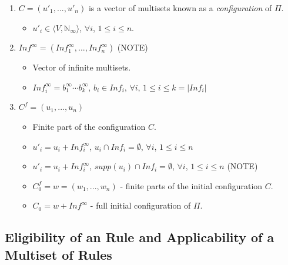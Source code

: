 \documentclass{article}
\begin{document}
\begin{appendices}
\begin{enumerate}
   \item $C = (u'_1,...,u'_n)$ is a vector of multisets known as a \emph{configuration} of $\Pi$.
         \begin{itemize}
         \item $u'_i \in \langle V, \mathbb{N}_{\infty} \rangle$, $\forall i$, $1 \leq i \leq n$.
         \end{itemize}
   \item $Inf^{\infty} = (Inf_1^{\infty},...,Inf_n^{\infty})$ (NOTE)
         \begin{itemize}
         \item Vector of infinite multisets.
         \item $Inf^{\infty}_i = b_1^{\infty}\cdots b_k^{\infty}$, $b_i \in Inf_i$, $\forall i$, $1 \leq i \leq k = |Inf_i|$ 
         \end{itemize}
   \item $C^{f} = (u_1,...,u_n)$
         \begin{itemize}
         \item Finite part of the configuration $C$.
         \item $u'_i = u_i + Inf_i^{\infty}$, $u_i \cap Inf_i = \emptyset$, $\forall i$, $1 \leq i \leq n$ 
         \item $u'_i = u_i + Inf_i^{\infty}$, $supp(u_i) \cap Inf_i = \emptyset$, $\forall i$, $1 \leq i \leq n$ (NOTE)
         \item $C^f_0 = w = (w_1,...,w_n)$ - finite parts of the initial configuration $C$.
         \item $C_0 = w + Inf^{\infty}$ - full initial configuration of $\Pi$.
         \end{itemize}

\end{enumerate}


\subsection{Eligibility of an Rule and Applicability of a Multiset of Rules} \label{a-ff1-eligible}


\end{appendices}
\end{document}
